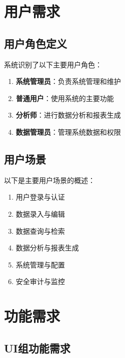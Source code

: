 \documentclass[a4paper,12pt]{article}
\begin{document}
\section{用户需求}

\subsection{用户角色定义}

系统识别了以下主要用户角色：

\begin{enumerate}
  \item \textbf{系统管理员}：负责系统管理和维护
  \item \textbf{普通用户}：使用系统的主要功能
  \item \textbf{分析师}：进行数据分析和报表生成
  \item \textbf{数据管理员}：管理系统数据和权限
\end{enumerate}

\subsection{用户场景}

以下是主要用户场景的概述：

\begin{enumerate}
  \item 用户登录与认证
  \item 数据录入与编辑
  \item 数据查询与检索
  \item 数据分析与报表生成
  \item 系统管理与配置
  \item 安全审计与监控
\end{enumerate}

\section{功能需求}

\subsection{UI组功能需求}
\end{document}
